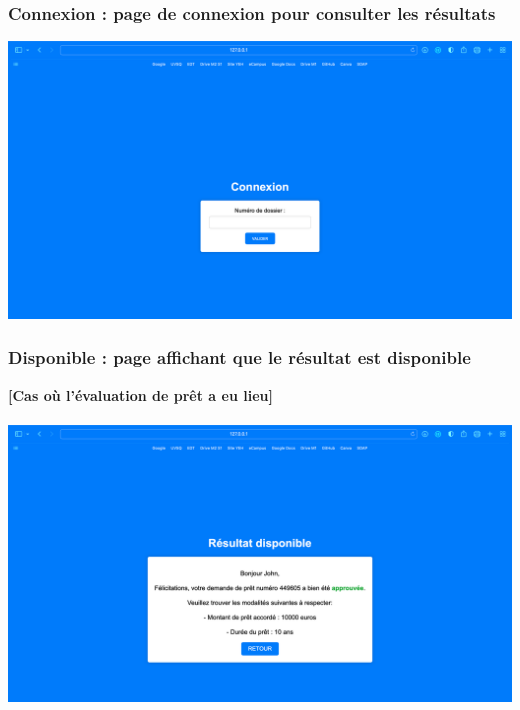 \documentclass{article}
\begin{document}
    \subsubsection{Connexion : page de connexion pour consulter les résultats}
    \includegraphics[width=\textwidth]{Images/8.1/connexion.png}
    
    \newpage
    
    \subsubsection{Disponible : page affichant que le résultat est disponible}
    \textbf{[Cas où l'évaluation de prêt a eu lieu]}\\ \\
    \includegraphics[width=\textwidth]{Images/8.1/disponible.png}
\end{document}
